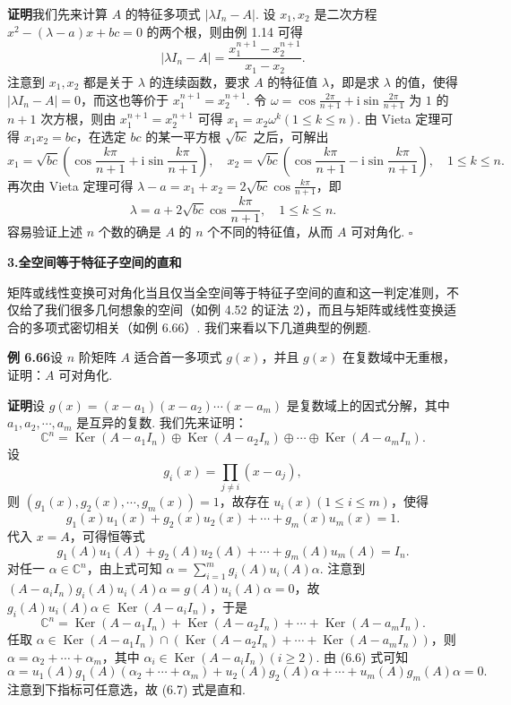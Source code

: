 \documentclass[UTF8, 12pt, fontset=fandol, oneside]{ctexart}
\begin{document}
\noindent\textbf{证明}\quad 我们先来计算 $A$ 的特征多项式 $|\lambda I_n-A|$. 设 $x_1,x_2$ 是二次方程 $x^2-(\lambda-a)x+bc=0$ 的两个根，则由例 1.14 可得
\[
|\lambda I_n-A|=\frac{x_1^{n+1}-x_2^{n+1}}{x_1-x_2}.
\]
注意到 $x_1,x_2$ 都是关于 $\lambda$ 的连续函数，要求 $A$ 的特征值 $\lambda$，即是求 $\lambda$ 的值，使得 $|\lambda I_n-A|=0$，而这也等价于 $x_1^{n+1}=x_2^{n+1}$. 令 $\omega=\cos\frac{2\pi}{n+1}+\mathrm{i}\sin\frac{2\pi}{n+1}$ 为 $1$ 的 $n+1$ 次方根，则由 $x_1^{n+1}=x_2^{n+1}$ 可得 $x_1=x_2\omega^k(1\le k\le n)$. 由 Vieta 定理可得 $x_1x_2=bc$，在选定 $bc$ 的某一平方根 $\sqrt{bc}$ 之后，可解出
\[
x_1=\sqrt{bc}\left(\cos\frac{k\pi}{n+1}+\mathrm{i}\sin\frac{k\pi}{n+1}\right),\quad
x_2=\sqrt{bc}\left(\cos\frac{k\pi}{n+1}-\mathrm{i}\sin\frac{k\pi}{n+1}\right),\quad 1\le k\le n.
\]
再次由 Vieta 定理可得 $\lambda-a=x_1+x_2=2\sqrt{bc}\cos\frac{k\pi}{n+1}$，即
\[
\lambda=a+2\sqrt{bc}\cos\frac{k\pi}{n+1},\quad 1\le k\le n.
\]
容易验证上述 $n$ 个数的确是 $A$ 的 $n$ 个不同的特征值，从而 $A$ 可对角化. $\square$

\noindent\textbf{3.\quad 全空间等于特征子空间的直和}

矩阵或线性变换可对角化当且仅当全空间等于特征子空间的直和这一判定准则，不仅给了我们很多几何想象的空间（如例 4.52 的证法 2），而且与矩阵或线性变换适合的多项式密切相关（如例 6.66）. 我们来看以下几道典型的例题.

\noindent\textbf{例 6.66}\quad 设 $n$ 阶矩阵 $A$ 适合首一多项式 $g(x)$，并且 $g(x)$ 在复数域中无重根，证明：$A$ 可对角化.

\noindent\textbf{证明}\quad 设 $g(x)=(x-a_1)(x-a_2)\cdots(x-a_m)$ 是复数域上的因式分解，其中 $a_1,a_2,\cdots,a_m$ 是互异的复数. 我们先来证明：
\begin{equation}
\mathbb{C}^n=\operatorname{Ker}(A-a_1I_n)\oplus\operatorname{Ker}(A-a_2I_n)\oplus\cdots\oplus\operatorname{Ker}(A-a_mI_n).
\tag{6.5}
\end{equation}
设
\[
g_i(x)=\prod_{j\ne i}(x-a_j),
\]
则 $(g_1(x),g_2(x),\cdots,g_m(x))=1$，故存在 $u_i(x)(1\le i\le m)$，使得
\[
g_1(x)u_1(x)+g_2(x)u_2(x)+\cdots+g_m(x)u_m(x)=1.
\]
代入 $x=A$，可得恒等式
\begin{equation}
g_1(A)u_1(A)+g_2(A)u_2(A)+\cdots+g_m(A)u_m(A)=I_n.
\tag{6.6}
\end{equation}
对任一 $\alpha\in\mathbb{C}^n$，由上式可知 $\alpha=\sum_{i=1}^m g_i(A)u_i(A)\alpha$. 注意到 $(A-a_iI_n)g_i(A)u_i(A)\alpha=g(A)u_i(A)\alpha=0$，故 $g_i(A)u_i(A)\alpha\in\operatorname{Ker}(A-a_iI_n)$，于是
\begin{equation}
\mathbb{C}^n=\operatorname{Ker}(A-a_1I_n)+\operatorname{Ker}(A-a_2I_n)+\cdots+\operatorname{Ker}(A-a_mI_n).
\tag{6.7}
\end{equation}
任取 $\alpha\in\operatorname{Ker}(A-a_1I_n)\cap(\operatorname{Ker}(A-a_2I_n)+\cdots+\operatorname{Ker}(A-a_mI_n))$，则 $\alpha=\alpha_2+\cdots+\alpha_m$，其中 $\alpha_i\in\operatorname{Ker}(A-a_iI_n)(i\ge 2)$. 由 (6.6) 式可知
\[
\alpha=u_1(A)g_1(A)(\alpha_2+\cdots+\alpha_m)+u_2(A)g_2(A)\alpha+\cdots+u_m(A)g_m(A)\alpha=0.
\]
注意到下指标可任意选，故 (6.7) 式是直和.
\end{document}
